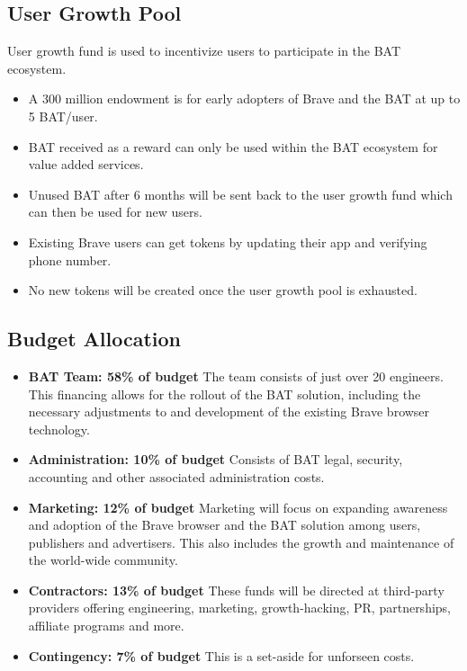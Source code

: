 \documentclass[11pt]{article}
\begin{document}
\subsection{User Growth Pool}
\label{sec-6-3}
User growth fund is used to incentivize users to participate in the \textrm{BAT} ecosystem.
\begin{itemize}
\item{A 300 million endowment is for early adopters of Brave and the BAT at up to 5 \textrm{BAT}/user.}
\item{\textrm{BAT} received as a reward can only be used within the \textrm{BAT} ecosystem for value added services.}
\item{Unused \textrm{BAT} after 6 months will be sent back to the user growth fund which can then be used for new users.}
\item{Existing Brave users can get tokens by updating their app and verifying phone number.}
\item{No new tokens will be created once the user growth pool is exhausted.}
\end{itemize}

\subsection{Budget Allocation}
\label{sec-6-4}
\begin{itemize}
\item{\textbf{BAT Team: 58\% of budget} The team consists of just over 20 engineers. This financing allows for the rollout of the \textrm{BAT} solution, including the necessary adjustments to and development of the existing Brave browser technology.  }
\item{\textbf{Administration: 10\% of budget} Consists of \textrm{BAT} legal, security, accounting and other associated administration costs. }
\item{\textbf{Marketing: 12\% of budget} Marketing will focus on expanding awareness and adoption of the Brave browser and the \textrm{BAT} solution among users, publishers and advertisers. This also includes the growth and maintenance of the world-wide community.}
\item{\textbf{Contractors: 13\% of budget} These funds will be directed at third-party providers offering engineering, marketing, growth-hacking, PR, partnerships, affiliate programs and more. }
\item{\textbf{Contingency: 7\% of budget} This is a set-aside for unforseen costs. }
\end{itemize}
\end{document}
